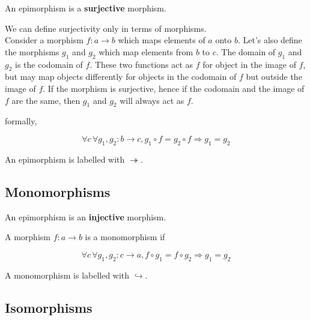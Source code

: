 \documentclass[a4paper]{article}
\begin{document}
An epimorphism is a \textbf{surjective} morphism.

We can define surjectivity only in terms of morphisms.
\\
Consider a morphism \(f: a \rightarrow b\) which maps elements of \(a\) onto \(b\).
Let's also define the morphisms \(g_1\) and \(g_2\) which map elements from \(b\) to \(c\).
The domain of \(g_1\) and \(g_2\) is the codomain of \(f\). These two functions act
as \(f\) for object in the image of \(f\), but may map objects differently
for objects in the codomain of \(f\) but outside the image of \(f\).
If the morphism is surjective, hence if the codomain and the image of \(f\) are the same,
then \(g_1\) and \(g_2\) will always act as \(f\).

\begin{center}
\end{center}

formally,

\[
    \forall c\, \forall g_1, g_2 : b \rightarrow c, g_1 \circ f = g_2 \circ f \Rightarrow g_1 = g_2
\]

An epimorphism is labelled with \(\twoheadrightarrow\).

\subsection{Monomorphisms}

An epimorphism is an \textbf{injective} morphism.

\begin{center}
\end{center}

A morphism \(f: a \rightarrow b\) is a monomorphism if

\[
    \forall c\, \forall g_1, g_2: c \rightarrow a, 
    f \circ g_1 = f \circ g_2 \Rightarrow g_1 = g_2
\]

A monomorphism is labelled with \(\hookrightarrow\).

\subsection{Isomorphisms}
\end{document}
